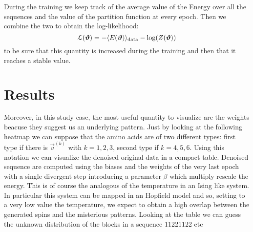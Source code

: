 \documentclass[prl, twocolumn]{revtex4-2}
\begin{document}
During the training we keep track of the average value of the Energy over all the sequences and the value of the partition function at every epoch. Then we combine the two to obtain the log-likelihood:
\begin{equation} 
\mathcal{L}(\bm{\vartheta}) = -\langle E(\bm{\vartheta})\rangle_{\mathrm{data}} - \log(Z(\bm{\vartheta}))
\end{equation}
to be sure that this quantity is increased during the training and then that it reaches a stable value.

\section{Results}
Moreover, in this study case, the most useful quantity to visualize are the weights beacuse they suggest us an underlying pattern. Just by looking at the following heatmap we can suppose that the amino acids are of two different types: first type if there is $\vec{v}^{(k)}$ with $k=1,2,3$, second type if $k=4,5,6$. Using this notation we can visualize the denoised original data in a compact table. Denoised sequence are computed using the biases and the weights of the very last epoch with a single divergent step introducing a parameter $\beta$ which multiply rescale the energy. This is of course the analogous of the temperature in an Ising like system. In particular this system can be mapped in an Hopfield model and so, setting to a very low value the temperature, we expect to obtain a high overlap between the generated spins and the misterious patterns.
Looking at the table we can guess the unknown distribution of the blocks in a sequence 11221122 etc 


\end{document}
